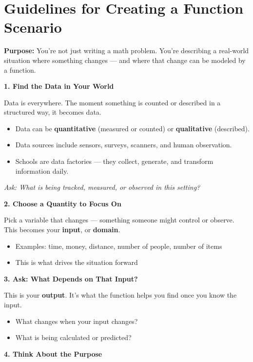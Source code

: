 \documentclass[12pt]{article}
\begin{document}
\section*{Guidelines for Creating a Function Scenario}

\textbf{Purpose:} You're not just writing a math problem. You're describing a real-world situation where something changes — and where that change can be modeled by a function.

\textbf{1. Find the Data in Your World}

Data is everywhere. The moment something is counted or described in a structured way, it becomes data.

\begin{itemize}[nosep]
  \item Data can be \textbf{quantitative} (measured or counted) or \textbf{qualitative} (described).
  \item Data sources include sensors, surveys, scanners, and human observation.
  \item Schools are data factories — they collect, generate, and transform information daily.
\end{itemize}

\textit{Ask: What is being tracked, measured, or observed in this setting?}

\textbf{2. Choose a Quantity to Focus On}

Pick a variable that changes — something someone might control or observe. This becomes your \textbf{input}, or \textbf{domain}.

\begin{itemize}[nosep]
  \item Examples: time, money, distance, number of people, number of items
  \item This is what drives the situation forward
\end{itemize}

\textbf{3. Ask: What Depends on That Input?}

This is your \textbf{output}. It’s what the function helps you find once you know the input.

\begin{itemize}[nosep]
  \item What changes when your input changes?
  \item What is being calculated or predicted?
\end{itemize}

\textbf{4. Think About the Purpose}
\end{document}

